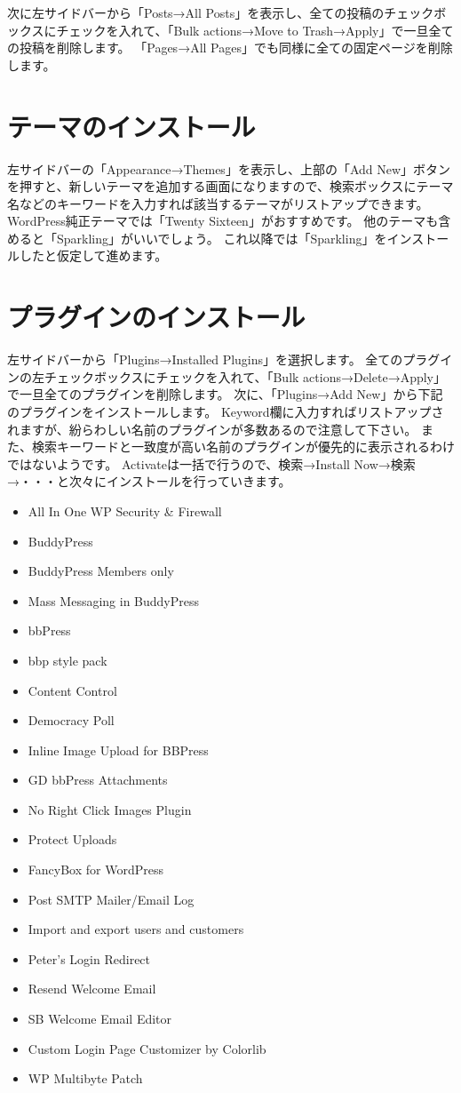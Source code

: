 \documentclass[titlepage,10pt,a4paper,uplatex]{jsbook}
\begin{document}
次に左サイドバーから「Posts→All Posts」を表示し、全ての投稿のチェックボックスにチェックを入れて、「Bulk actions→Move to Trash→Apply」で一旦全ての投稿を削除します。
「Pages→All Pages」でも同様に全ての固定ページを削除します。

\section{テーマのインストール}

左サイドバーの「Appearance→Themes」を表示し、上部の「Add New」ボタンを押すと、新しいテーマを追加する画面になりますので、検索ボックスにテーマ名などのキーワードを入力すれば該当するテーマがリストアップできます。
WordPress純正テーマでは「Twenty Sixteen」がおすすめです。
他のテーマも含めると「Sparkling」がいいでしょう。
これ以降では「Sparkling」をインストールしたと仮定して進めます。

\section{プラグインのインストール}

左サイドバーから「Plugins→Installed Plugins」を選択します。
全てのプラグインの左チェックボックスにチェックを入れて、「Bulk actions→Delete→Apply」で一旦全てのプラグインを削除します。
次に、「Plugins→Add New」から下記のプラグインをインストールします。
Keyword欄に入力すればリストアップされますが、紛らわしい名前のプラグインが多数あるので注意して下さい。
また、検索キーワードと一致度が高い名前のプラグインが優先的に表示されるわけではないようです。
Activateは一括で行うので、検索→Install Now→検索→・・・と次々にインストールを行っていきます。

\begin{itemize}
\item All In One WP Security \& Firewall
\item BuddyPress
\item BuddyPress Members only
\item Mass Messaging in BuddyPress
\item bbPress
\item bbp style pack
\item Content Control
\item Democracy Poll
\item Inline Image Upload for BBPress
\item GD bbPress Attachments
\item No Right Click Images Plugin
\item Protect Uploads
\item FancyBox for WordPress
\item Post SMTP Mailer/Email Log
\item Import and export users and customers
\item Peter's Login Redirect
\item Resend Welcome Email
\item SB Welcome Email Editor
\item Custom Login Page Customizer by Colorlib
\item WP Multibyte Patch
\end{itemize}
\end{document}
